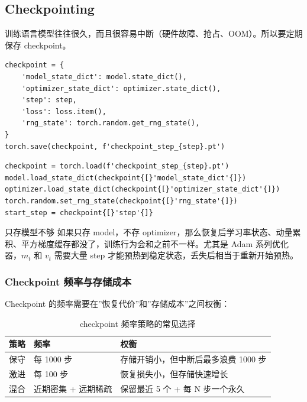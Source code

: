 \documentclass[a4paper]{article}
\begin{document}
\subsection{Checkpointing}

训练语言模型往往很久，而且很容易中断（硬件故障、抢占、OOM）。所以要定期保存 checkpoint。

\begin{lstlisting}[caption={保存 checkpoint 的标准写法}]
checkpoint = {
    'model_state_dict': model.state_dict(),
    'optimizer_state_dict': optimizer.state_dict(),
    'step': step,
    'loss': loss.item(),
    'rng_state': torch.random.get_rng_state(),
}
torch.save(checkpoint, f'checkpoint_step_{step}.pt')
\end{lstlisting}

\begin{lstlisting}[caption={恢复 checkpoint 的标准写法}]
checkpoint = torch.load(f'checkpoint_step_{step}.pt')
model.load_state_dict(checkpoint{[}'model_state_dict'{]})
optimizer.load_state_dict(checkpoint{[}'optimizer_state_dict'{]})
torch.random.set_rng_state(checkpoint{[}'rng_state'{]})
start_step = checkpoint{[}'step'{]}
\end{lstlisting}

\begin{warningbox}{只存模型不够}
如果只存 model，不存 optimizer，那么恢复后学习率状态、动量累积、平方梯度缓存都没了，训练行为会和之前不一样。尤其是 Adam 系列优化器，$m_t$ 和 $v_t$ 需要大量 step 才能预热到稳定状态，丢失后相当于重新开始预热。
\end{warningbox}

\subsubsection{Checkpoint 频率与存储成本}

Checkpoint 的频率需要在”恢复代价”和”存储成本”之间权衡：

\begin{table}[H]
\centering
\begin{tabular}{p{}p{}p{}}
\toprule
\textbf{策略} & \textbf{频率} & \textbf{权衡} \\
\midrule
保守 & 每 1000 步 & 存储开销小，但中断后最多浪费 1000 步 \\
激进 & 每 100 步 & 恢复损失小，但存储快速增长 \\
混合 & 近期密集 + 远期稀疏 & 保留最近 5 个 + 每 N 步一个永久 \\
\bottomrule
\end{tabular}
\caption{checkpoint 频率策略的常见选择}
\end{table}
\end{document}
